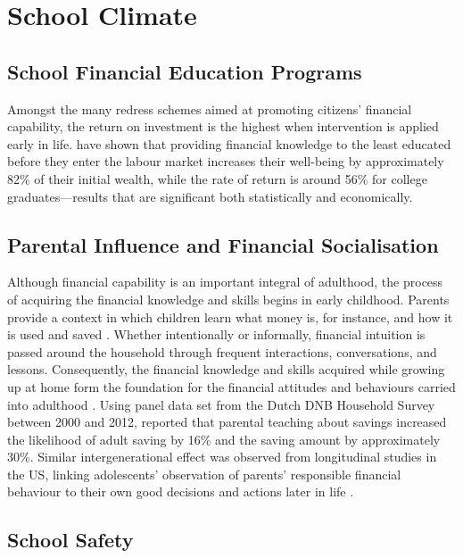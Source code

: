 \documentclass[a4paper,11pt,UKenglish,twoside,openright]{report}\usepackage[]{graphicx}\usepackage[]{color}
\begin{document}
\section{School Climate}\label{sec:sc}



\subsection{School Financial Education Programs}

Amongst the many redress schemes aimed at promoting citizens' financial capability, the return on investment is the highest when intervention is applied early in life. \textcite{lusardi:2014} have shown that providing financial knowledge to the least educated before they enter the labour market increases their well-being by approximately 82\% of their initial wealth, while the rate of return is around 56\% for college graduates---results that are significant both statistically and economically.

\subsection{Parental Influence and Financial Socialisation}

Although financial capability is an important integral of adulthood, the process of acquiring the financial knowledge and skills begins in early childhood. Parents provide a context in which children learn what money is, for instance, and how it is used and saved \parencite{birbili:2015}. Whether intentionally or informally, financial intuition is passed around the household through frequent interactions, conversations, and lessons. Consequently, the financial knowledge and skills acquired while growing up at home form the foundation for the financial attitudes and behaviours carried into adulthood \parencite{serido:2016}. Using panel data set from the Dutch DNB Household Survey between 2000 and 2012, \textcite{bucciol:2014} reported that parental teaching about savings increased the likelihood of adult saving by 16\% and the saving amount by approximately 30\%. Similar intergenerational effect was observed from longitudinal studies in the US, linking adolescents' observation of parents' responsible financial behaviour to their own good decisions and actions later in life \parencite{tang:2017}.

\subsection{School Safety}
\end{document}
